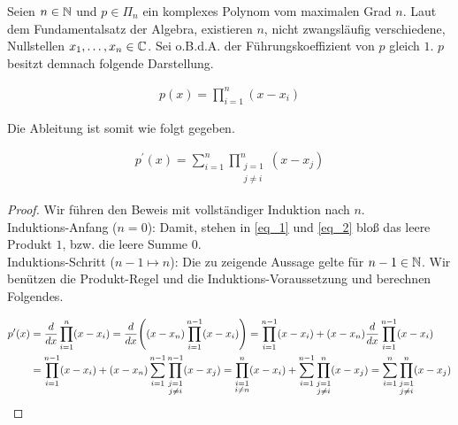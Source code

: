 \begin{proposition}

\label{prop_1}

Seien $n \in \mathbb{N}$ und $p \in \Pi_n$ ein komplexes Polynom vom maximalen Grad $n$.
Laut dem Fundamentalsatz der Algebra, existieren $n$, nicht zwangsläufig verschiedene, Nullstellen $x_1, \ldots, x_n \in \mathbb{C}$.
Sei o.B.d.A. der Führungskoeffizient von $p$ gleich $1$.
$p$ besitzt demnach folgende Darstellung.

\begin{align} \label{eq_1}
  p(x)
  =
  \prod_{i=1}^n (x - x_i)
\end{align}

Die Ableitung ist somit wie folgt gegeben.

\begin{align} \label{eq_2}
  p^\prime(x)
  =
  \sum_{i=1}^n
  \prod_{\substack{j=1 \\ j \neq i}}^n
  (x - x_j)
\end{align}

\end{proposition}

\begin{proof}

Wir führen den Beweis mit vollständiger Induktion nach $n$. \\

Induktions-Anfang ($n = 0$):
Damit, stehen in \eqref{eq_1} und \eqref{eq_2} bloß das leere Produkt $1$, bzw. die leere Summe $0$. \\

Induktions-Schritt ($n-1 \mapsto n$):
Die zu zeigende Aussage gelte für $n-1 \in \mathbb{N}$.
Wir benützen die Produkt-Regel und die Induktions-Voraussetzung und berechnen Folgendes.

\begin{align*}
  p^\prime(x)
  & =
  \frac{d}{dx}
  \prod_{i=1}^{n} (x - x_i)
  =
  \frac{d}{dx}
  {\left ( 
    (x - x_n)
    \prod_{i=1}^{n-1} (x - x_i)
   \right )}
  =
  \prod_{i=1}^{n-1} (x - x_i)
  +
  (x - x_n)
  \frac{d}{dx}
  \prod_{i=1}^{n-1} (x - x_i) \\
  & =
  \prod_{i=1}^{n-1} (x - x_i)
  +
  (x - x_n)
  \sum_{i=1}^{n-1}
  \prod_{\substack{j=1 \\ j \neq i}}^{n-1} (x - x_j)
  =
  \prod_{\substack{i=1 \\ i \neq n}}^n (x - x_i)
  +
  \sum_{i=1}^{n-1}
  \prod_{\substack{j=1 \\ j \neq i}}^n (x - x_j)
  =
  \sum_{i=1}^n
  \prod_{\substack{j=1 \\ j \neq i}}^n
  (x - x_j)
\end{align*}

\end{proof}
